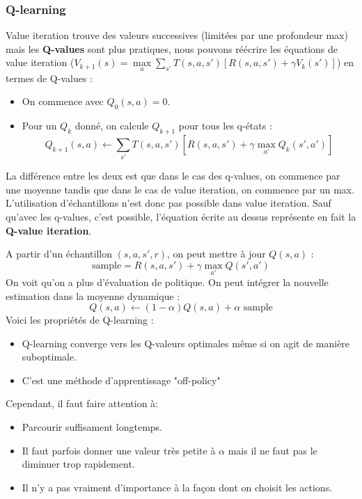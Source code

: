\subsubsection{Q-learning} %
\label{ssubsub:q_learning}
Value iteration trouve des valeurs successives (limitées par une profondeur max) mais les \textbf{Q-values} sont plus pratiques, 
nous pouvons réécrire les équations de value iteration ($V_{k+1}(s)=\max\limits_{a}\sum_{s'}T(s,a,s')[R(s,a,s')+\gamma V_k(s')]$)
en termes de Q-values :
\begin{itemize}[label=\textbullet]
    \item On commence avec $Q_0(s,a)=0$.
    \item Pour un $Q_k$ donné, on calcule $Q_{k+1}$ pour tous les q-états :
    \begin{equation*}
        Q_{k+1}(s,a)\leftarrow\sum_{s'}T(s,a,s')[R(s,a,s')+\gamma\max\limits_{a'}Q_k(s',a')]
    \end{equation*}
\end{itemize}
La différence entre les deux est que dans le cas des q-values, on commence par une moyenne tandis que dans le cas de value iteration,
on commence par un max. L'utilisation d'échantillons n'est donc pas possible dans value iteration. Sauf qu'avec les q-values,
c'est possible, l'équation écrite au dessus représente en fait la \textbf{Q-value iteration}.


A partir d'un échantillon $(s,a,s',r)$, on peut mettre à jour $Q(s,a)$ :
\begin{equation*}
    \text{sample} = R(s,a,s')+\gamma\max\limits_{a'}Q(s',a')
\end{equation*}
On voit qu'on a plus d'évaluation de politique. On peut intégrer la nouvelle estimation dans la moyenne dynamique :
\begin{equation*}
    Q(s,a)\leftarrow (1-\alpha)Q(s,a)+\alpha\text{ sample}
\end{equation*}
Voici les propriétés de Q-learning :
\begin{itemize}[label=\textbullet]
    \item Q-learning converge vers les Q-valeurs optimales même si on agit de manière suboptimale.
    \item C'est une méthode d'apprentissage "off-policy"
\end{itemize}
Cependant, il faut faire attention à:
\begin{itemize}[label=\textbullet]
    \item Parcourir suffisament longtemps.
    \item Il faut parfois donner une valeur très petite à $\alpha$ mais il ne faut pas le diminuer trop rapidement.
    \item Il n'y a pas vraiment d'importance à la façon dont on choisit les actions.
\end{itemize}
